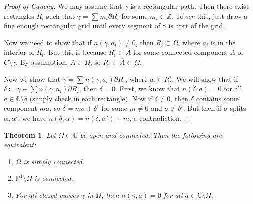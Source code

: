 \documentclass[leqno, openany]{memoir}
\newtheorem{thm}{Theorem}[section]
\theoremstyle{definition}
\theoremstyle{remark}
\theoremstyle{plain}
\theoremstyle{definition}
\theoremstyle{remark}
\newcommand{\C}{\mathbb{C}}
\newcommand{\Z}{\mathbb{Z}}
\renewcommand{\P}{\mathbb{P}}
\newcommand{\ol}[1]{\overline{#1}}
\begin{document}
\begin{proof}[Proof of Cauchy] We may assume that $\gamma$ is a rectangular
    path. Then there exist rectangles $R_i$ such that $\gamma = \sum m_i
    \partial R_i$ for some $m_i \in \Z$. To see this, just draw a fine enough
    rectangular grid until every segment of $\gamma$ is aprt of the grid.

    Now we need to show that if $n(\gamma, a_i) \neq 0$, then $R_i \subset
    \Omega$, where $a_i$ is in the interior of $R_i$. But this is because
    $R_i^{\circ} \subset A$ for some connected component $A$ of $C \setminus
    \gamma$. By assumption, $A \subset \Omega$, so $R_i \subset \ol{A} \subset
    \Omega$.

    Now we show that $\gamma = \sum n(\gamma, a_i) \partial R_i$, where $a_i
\in R_i^{\circ}$. We will show that if $\delta \coloneqq \gamma - \sum
n(\gamma, a_i) \partial R_i$, then $\delta = 0$. First, we know that $n(\delta,
a) = 0$ for all $a \in \C \setminus \delta$ (simply check in each rectangle).
Now if $\delta \neq 0$, then $\delta$ contains some component $m \sigma$, so
$\delta = m \sigma + \delta'$ for some $m \neq 0$ and $\sigma \not\subset
\delta'$. But then if $\sigma$ splits $\alpha, \alpha'$, we have $n(\delta,
\alpha) = n(\delta, \alpha') + m$, a contradiction.  \end{proof}

\begin{thm} Let $\Omega \subset \C$ be open and connected. Then the following
    are equivalent: \begin{enumerate} \item $\Omega$ is simply connected.
        \item $\P^1 \setminus \Omega$ is connected.  \item For all closed
            curves $\gamma$ in $\Omega$, then $n(\gamma, a) = 0$ for all $a \in
            \C \setminus \Omega$.  \end{enumerate} \end{thm}
\end{document}
